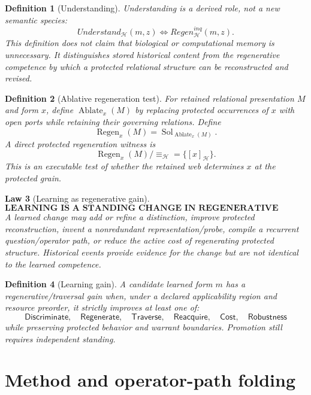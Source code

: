 \documentclass[11pt,oneside]{article}
\newtheorem{definition}{Definition}[section]
\newtheorem{law}[definition]{Law}
\begin{document}
\begin{definition}[Understanding]
Understanding is a derived role, not a new semantic species:
\[
\boxed{
Understand_{\mathcal H}(m,z)
\iff
Regen^{inq}_{\mathcal H}(m,z).
}
\]
This definition does not claim that biological or computational memory is unnecessary.  It distinguishes stored historical content from the regenerative competence by which a protected relational structure can be reconstructed and revised.
\end{definition}

\begin{definition}[Ablative regeneration test]
For retained relational presentation \(M\) and form \(x\), define \(\operatorname{Ablate}_x(M)\) by replacing protected occurrences of \(x\) with open ports while retaining their governing relations.  Define
\[
\boxed{
\operatorname{Regen}_x(M)
=
\operatorname{Sol}_{\operatorname{Ablate}_x(M)}.
}
\]
A direct protected regeneration witness is
\[
\operatorname{Regen}_x(M)/{\equiv_{\mathcal H}}
=
\{[x]_{\mathcal H}\}.
\]
This is an executable test of whether the retained web determines \(x\) at the protected grain.
\end{definition}

\begin{law}[Learning as regenerative gain]
\[
\boxed{\textbf{LEARNING IS A STANDING CHANGE IN REGENERATIVE CAPACITY.}}
\]
A learned change may add or refine a distinction, improve protected reconstruction, invent a nonredundant representation/probe, compile a recurrent question/operator path, or reduce the active cost of regenerating protected structure.  Historical events provide evidence for the change but are not identical to the learned competence.
\end{law}

\begin{definition}[Learning gain]
A candidate learned form \(m\) has a regenerative/traversal gain when, under a declared applicability region and resource preorder, it strictly improves at least one of:
\[
\mathsf{Discriminate},\quad
\mathsf{Regenerate},\quad
\mathsf{Traverse},\quad
\mathsf{Reacquire},\quad
\mathsf{Cost},\quad
\mathsf{Robustness}
\]
while preserving protected behavior and warrant boundaries.  Promotion still requires independent standing.
\end{definition}

\section{Method and operator-path folding}
\end{document}
